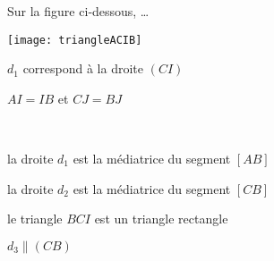 \begin{QCM}
\begin{GroupeQCM}
    \begin{exercice}
      Sur la figure ci‑dessous, \ldots
      
     \begin{minipage}[c]{0.32\textwidth}
     \quad \texttt{[image: triangleACIB]}
     \end{minipage} \hfill%
     \begin{minipage}[c]{0.66\textwidth}
     $d_1$ correspond à la droite $(CI)$
     
     $AI = IB$ et $CJ = BJ$
     \end{minipage} \\
      
      \begin{ChoixQCM}{4}
      \item la droite $d_1$ est la médiatrice du segment $[AB]$
      \item la droite $d_2$ est la médiatrice du segment $[CB]$
      \item le triangle $BCI$ est un triangle rectangle
      \item $d_3 \parallel (CB)$
      \end{ChoixQCM}
\begin{corrige}
   \end{corrige}
    \end{exercice}
    

\end{GroupeQCM}
\end{QCM}

  
